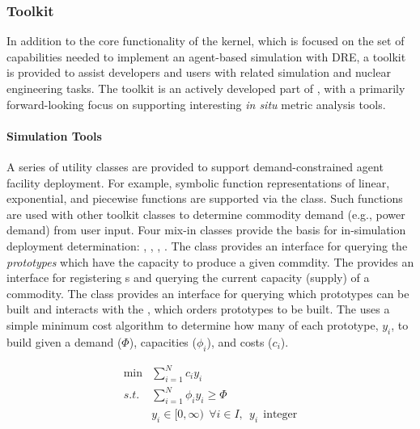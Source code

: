 \subsubsection{Toolkit}

In addition to the core functionality of the \Cyclus kernel, which is focused on
the set of capabilities needed to implement an agent-based simulation
with \gls{DRE}, a toolkit is provided to assist developers
and users with related simulation and nuclear engineering tasks. The toolkit is
an actively developed part of \Cyclus, with a primarily forward-looking
focus on supporting interesting \textit{in situ} metric analysis tools.

\paragraph{Simulation Tools}

A series of utility classes are provided to support demand-constrained agent
facility deployment. For example, symbolic function representations of linear,
exponential, and piecewise functions are supported via the
 class. Such functions are used with other toolkit
classes to determine commodity demand (e.g., power demand) from user input. Four
mix-in classes provide the basis for in-simulation deployment determination:
, , ,
. The  class provides an
interface for querying the \textit{prototypes} which have the
capacity to produce a given commdity. The 
provides an interface for registering s and querying
the current capacity (supply) of a commodity. The  class provides
an interface for querying which prototypes can be built and interacts with the
, which orders prototypes to be built. The
 uses a simple minimum cost algorithm to determine how
many of each prototype, $y_i$, to build given a demand ($\Phi$), capacities
($\phi_i$), and costs ($c_i$).

\begin{equation}
\begin{aligned}
 \min & \sum_{i=1}^{N}c_i y_i \\
 s.t. & \sum_{i=1}^{N}\phi_i y_i \ge \Phi \\
      & y_i \in [0,\infty) \:\: \forall i \in I, \:\: y_i \:\: \text{integer}
\end{aligned}
\end{equation}

